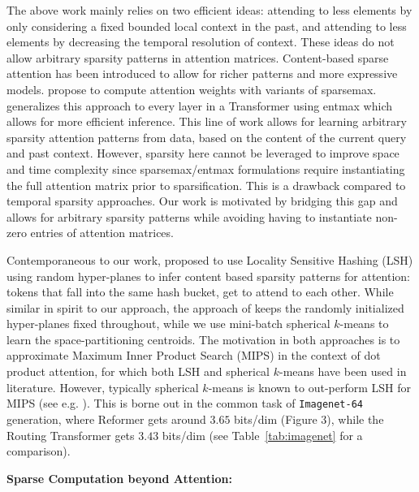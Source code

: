 The above work mainly relies on two efficient ideas: attending to less elements by only considering a fixed bounded local context in the past, and attending to less elements by decreasing the temporal resolution of context. These ideas do not allow arbitrary sparsity patterns in attention matrices. Content-based sparse attention has been introduced to allow for richer patterns and more expressive models.
\citet{martins-kreutzer-2017-learning, malaviya-etal-2018-sparse} propose to compute attention weights with variants of sparsemax. \citet{correia2019adaptively} generalizes this approach to every layer in a Transformer using entmax which allows for more efficient inference. This line of work allows for learning arbitrary sparsity attention patterns from data, based on the content of the current query and past context. However, sparsity here cannot be leveraged to improve space and time complexity since sparsemax/entmax formulations require instantiating the full attention matrix prior to sparsification. This is a drawback compared to temporal sparsity approaches. Our work is motivated by bridging this gap and allows for arbitrary sparsity patterns while avoiding having to instantiate non-zero entries of attention matrices.

Contemporaneous to our work, \citet{kitaev2020reformer} proposed to use Locality Sensitive Hashing (LSH) using random hyper-planes to infer content based sparsity patterns for attention: tokens that fall into the same hash bucket, get to attend to each other. While similar in spirit to our approach, the approach of \citet{kitaev2020reformer} keeps the randomly initialized hyper-planes fixed throughout, while we use mini-batch spherical \(k\)-means to learn the space-partitioning centroids. The motivation in both approaches is to approximate Maximum Inner Product Search (MIPS) in the context of dot product attention, for which both LSH and spherical \(k\)-means have been used in literature. However, typically spherical \(k\)-means is known to out-perform LSH for MIPS (see e.g. \citet{auvolat2015clustering}).
This is borne out in the common task of \texttt{Imagenet-64} generation, where Reformer gets around \(3.65\) bits/dim (Figure 3), while the Routing Transformer gets \(3.43\) bits/dim (see Table~\ref{tab:imagenet} for a comparison).

{\bf Sparse Computation beyond Attention:}

